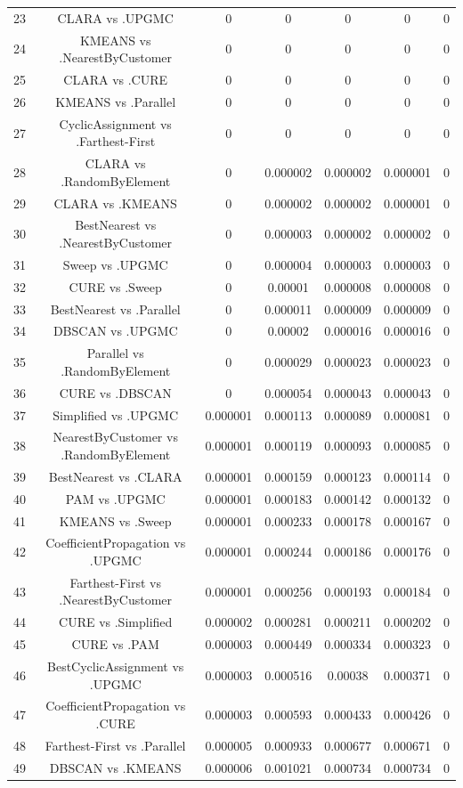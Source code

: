 \documentclass[a4paper,10pt]{article}
\begin{document}
\begin{landscape}
\begin{table}[!htp]
\begin{tabular}{ccccccc}
23&CLARA vs .UPGMC&0&0&0&0&0\\
24&KMEANS vs .NearestByCustomer&0&0&0&0&0\\
25&CLARA vs .CURE&0&0&0&0&0\\
26&KMEANS vs .Parallel&0&0&0&0&0\\
27&CyclicAssignment vs .Farthest-First&0&0&0&0&0\\
28&CLARA vs .RandomByElement&0&0.000002&0.000002&0.000001&0\\
29&CLARA vs .KMEANS&0&0.000002&0.000002&0.000001&0\\
30&BestNearest vs .NearestByCustomer&0&0.000003&0.000002&0.000002&0\\
31&Sweep vs .UPGMC&0&0.000004&0.000003&0.000003&0\\
32&CURE vs .Sweep&0&0.00001&0.000008&0.000008&0\\
33&BestNearest vs .Parallel&0&0.000011&0.000009&0.000009&0\\
34&DBSCAN vs .UPGMC&0&0.00002&0.000016&0.000016&0\\
35&Parallel vs .RandomByElement&0&0.000029&0.000023&0.000023&0\\
36&CURE vs .DBSCAN&0&0.000054&0.000043&0.000043&0\\
37&Simplified vs .UPGMC&0.000001&0.000113&0.000089&0.000081&0\\
38&NearestByCustomer vs .RandomByElement&0.000001&0.000119&0.000093&0.000085&0\\
39&BestNearest vs .CLARA&0.000001&0.000159&0.000123&0.000114&0\\
40&PAM vs .UPGMC&0.000001&0.000183&0.000142&0.000132&0\\
41&KMEANS vs .Sweep&0.000001&0.000233&0.000178&0.000167&0\\
42&CoefficientPropagation vs .UPGMC&0.000001&0.000244&0.000186&0.000176&0\\
43&Farthest-First vs .NearestByCustomer&0.000001&0.000256&0.000193&0.000184&0\\
44&CURE vs .Simplified&0.000002&0.000281&0.000211&0.000202&0\\
45&CURE vs .PAM&0.000003&0.000449&0.000334&0.000323&0\\
46&BestCyclicAssignment vs .UPGMC&0.000003&0.000516&0.00038&0.000371&0\\
47&CoefficientPropagation vs .CURE&0.000003&0.000593&0.000433&0.000426&0\\
48&Farthest-First vs .Parallel&0.000005&0.000933&0.000677&0.000671&0\\
49&DBSCAN vs .KMEANS&0.000006&0.001021&0.000734&0.000734&0\\

\end{tabular}
\end{table}
\end{landscape}
\end{document}
